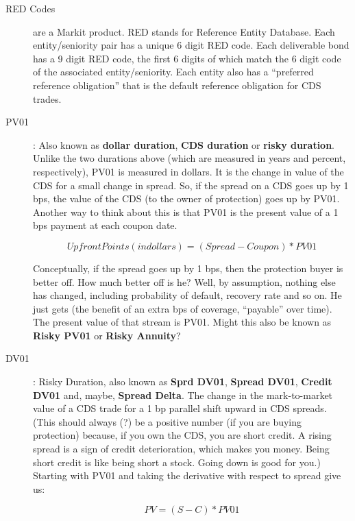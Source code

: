 \documentclass[12pt]{article}
\begin{document}
\begin{description}
  \item[RED Codes] are a Markit product. RED stands for Reference Entity Database. Each entity/seniority pair has a unique 6 digit RED code. Each deliverable bond has a 9 digit RED code, the first 6 digits of which match the 6 digit code of the associated entity/seniority. Each entity also has a ``preferred reference obligation'' that is the default reference obligation for CDS trades.
  
  \item[PV01]: Also known as \textbf{dollar duration}, \textbf{CDS duration} or \textbf{risky duration}. Unlike the two durations above (which are measured in years and percent, respectively), PV01 is measured in dollars. It is the change in value of the CDS for a small change in spread.  So, if the spread on a CDS goes up by 1 bps, the value of the CDS (to the owner of protection) goes up by PV01. Another way to think about this is that PV01 is the present value of a 1 bps payment at each coupon date. 

\begin{displaymath}
  Upfront Points (in dollars) = (Spread - Coupon) * PV01
\end{displaymath}


Conceptually, if the spread goes up by 1 bps, then the protection buyer is better off. How much better off is he? Well, by assumption, nothing else has changed, including probability of default, recovery rate and so on. He just gets (the benefit of an extra bps of coverage, ``payable'' over time). The present value of that stream is PV01. Might this also be known as \textbf{Risky PV01} or \textbf{Risky Annuity}?
   
  \item[DV01]: Risky Duration, also known as \textbf{Sprd DV01}, \textbf{Spread DV01}, \textbf{Credit DV01} and, maybe, \textbf{Spread Delta}. The change in the mark-to-market value of a CDS trade for a 1 bp parallel shift upward in CDS spreads. (This should always (?) be a positive number (if you are buying protection) because, if you own the CDS, you are short credit. A rising spread is a sign of credit deterioration, which makes you money. Being short credit is like being short a stock. Going down is good for you.) Starting with PV01 and taking the derivative with respect to spread give us:


\begin{displaymath}
  PV = (S - C) * PV01
\end{displaymath}
  

\end{description}
\end{document}
